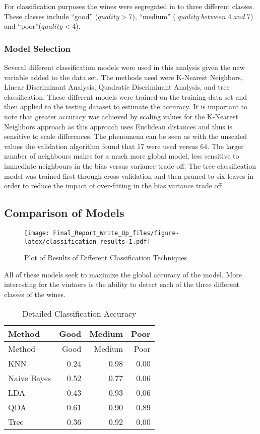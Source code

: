 \documentclass[]{article}
\begin{document}
For classification purposes the wines were segregated in to three
different classes. These classes include ``good'' (\(quality >7\)),
``medium'' (\(\; quality \; between \; 4 \;and\; 7\)) and
``poor''(\(quality < 4\)).

\subsubsection{Model Selection}\label{model-selection-1}

Several different classification models were used in this analysis given
the new variable added to the data set. The methods used were K-Nearest
Neighbors, Linear Discriminant Analysis, Quadratic Discriminant
Analysis, and tree classification. These different models were trained
on the training data set and then applied to the testing dataset to
estimate the accuracy. It is important to note that greater accuracy was
achieved by scaling values for the K-Nearest Neighbors approach as this
approach uses Euclidean distances and thus is sensitive to scale
differences. The phenomena can be seen as with the unscaled values the
validation algorithm found that 17 were used versus 64. The larger
number of neighbours makes for a much more global model, less sensitive
to immediate neighbours in the bias versus variance trade off. The tree
classification model was trained first through cross-validation and then
pruned to six leaves in order to reduce the impact of over-fitting in
the bias variance trade off.

\subsection{Comparison of Models}\label{comparison-of-models}

\begin{figure}[H]
\centering
\texttt{[image: Final\_Report\_Write\_Up\_files/figure-latex/classification\_results-1.pdf]}
\caption{Plot of Results of Different Classification Techniques}
\end{figure}

All of these models seek to maximize the global accuracy of the model.
More interesting for the vintners is the ability to detect each of the
three different classes of the wines.

\begin{longtable}[]{@{}lrrr@{}}
\caption{Detailed Classification Accuracy}\tabularnewline
\toprule
Method & Good & Medium & Poor\tabularnewline
\midrule
\endfirsthead
\toprule
Method & Good & Medium & Poor\tabularnewline
\midrule
\endhead
KNN & 0.24 & 0.98 & 0.00\tabularnewline
Naive Bayes & 0.52 & 0.77 & 0.06\tabularnewline
LDA & 0.43 & 0.93 & 0.06\tabularnewline
QDA & 0.61 & 0.90 & 0.89\tabularnewline
Tree & 0.36 & 0.92 & 0.00\tabularnewline
\bottomrule
\end{longtable}
\end{document}
